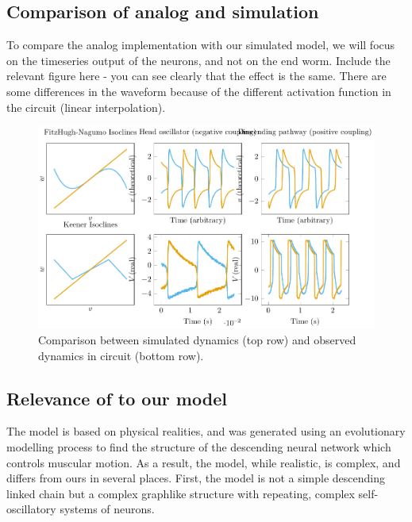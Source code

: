 \documentclass[
    11pt,
]{article}
\begin{document}
\subsection{Comparison of analog and simulation}

To compare the analog implementation with our simulated model, we will focus on the timeseries output of the neurons, and not on the end worm.  Include the relevant figure here - you can see clearly that the effect is the same.  There are some differences in the waveform because of the different activation function in the circuit (linear interpolation).

\begin{figure}[h!]
    \centering
    \pgfplotsset{}
    \includegraphics{figures/anal_sim_comp/anal_sim_comp}
    \caption{Comparison between simulated dynamics (top row) and observed dynamics in circuit (bottom row).}
    \label{fig: anal_sim_comp}
\end{figure}

\subsection{Relevance of \citet{izquierdo2018} to our model}

The \citet{izquierdo2018} model is based on physical realities, and was generated using an evolutionary modelling process to find the structure of the descending neural network which controls muscular motion.  As a result, the model, while realistic, is complex, and differs from ours in several places.  First, the model is not a simple descending linked chain but a complex graphlike structure with repeating, complex self-oscillatory systems of neurons.
\end{document}
